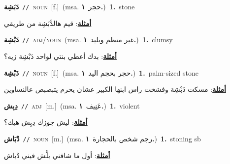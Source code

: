 \documentclass[10pt,a4paper,twoside]{article} %
\begin{document}
\begin{multicols}{2}
{\setlength\topsep{0pt}\textbf{\foreignlanguage{arabic}{دَبَشِة}}\ {\color{gray}\texttt{//}\color{black}}\ \textsc{noun}\ [f.]\ \color{gray}(msa. \foreignlanguage{arabic}{حجر}~\foreignlanguage{arabic}{\textbf{١.}})\color{black}\ \textbf{1.}~stone\  \begin{flushright}\color{gray}\foreignlanguage{arabic}{\textbf{\underline{\foreignlanguage{arabic}{أمثلة}}}: قيم هالدَّبَشِة من طريقي}\end{flushright}\color{black}} \vspace{2mm}

{\setlength\topsep{0pt}\textbf{\foreignlanguage{arabic}{دَبْشِة}}\ {\color{gray}\texttt{//}\color{black}}\ \textsc{adj/noun}\ \color{gray}(msa. \foreignlanguage{arabic}{غير منظم وبليد}~\foreignlanguage{arabic}{\textbf{١.}})\color{black}\ \textbf{1.}~clumsy\  \begin{flushright}\color{gray}\foreignlanguage{arabic}{\textbf{\underline{\foreignlanguage{arabic}{أمثلة}}}: بدك أعطي بنتي لواحد دَبْشِة زيه؟}\end{flushright}\color{black}} \vspace{2mm}

{\setlength\topsep{0pt}\textbf{\foreignlanguage{arabic}{دَبْشِة}}\ {\color{gray}\texttt{//}\color{black}}\ \textsc{noun}\ [f.]\ \color{gray}(msa. \foreignlanguage{arabic}{حجر بحجم اليد}~\foreignlanguage{arabic}{\textbf{١.}})\color{black}\ \textbf{1.}~palm-sized stone\  \begin{flushright}\color{gray}\foreignlanguage{arabic}{\textbf{\underline{\foreignlanguage{arabic}{أمثلة}}}: مسكت دَبْشِة وفشخت راس ابنها الكبير عشان يحرم يتبصبص عالنساوين}\end{flushright}\color{black}} \vspace{2mm}

{\setlength\topsep{0pt}\textbf{\foreignlanguage{arabic}{دِبِش}}\ {\color{gray}\texttt{//}\color{black}}\ \textsc{adj}\ [m.]\ \color{gray}(msa. \foreignlanguage{arabic}{عَنِيف}~\foreignlanguage{arabic}{\textbf{١.}})\color{black}\ \textbf{1.}~violent\  \begin{flushright}\color{gray}\foreignlanguage{arabic}{\textbf{\underline{\foreignlanguage{arabic}{أمثلة}}}: ليش جوزك دِبِش هيك؟}\end{flushright}\color{black}} \vspace{2mm}

{\setlength\topsep{0pt}\textbf{\foreignlanguage{arabic}{دْبَاش}}\ {\color{gray}\texttt{//}\color{black}}\ \textsc{noun}\ [m.]\ \color{gray}(msa. \foreignlanguage{arabic}{رجم شخص بالحجارة}~\foreignlanguage{arabic}{\textbf{١.}})\color{black}\ \textbf{1.}~stoning sb\  \begin{flushright}\color{gray}\foreignlanguage{arabic}{\textbf{\underline{\foreignlanguage{arabic}{أمثلة}}}: أول ما شافني بلَّش فيني دْباش}\end{flushright}\color{black}} \vspace{2mm}


\end{multicols}
\end{document}
